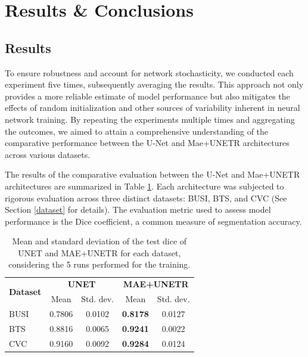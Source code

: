 \newpage

\section{Results \& Conclusions}
\subsection{Results}

To ensure robustness and account for network stochasticity, we conducted each experiment five times, subsequently averaging the results. This approach not only provides a more reliable estimate of model performance but also mitigates the effects of random initialization and other sources of variability inherent in neural network training.
By repeating the experiments multiple times and aggregating the outcomes, we aimed to attain a comprehensive understanding of the comparative performance between the U-Net and Mae+UNETR architectures across various datasets.

The results of the comparative evaluation between the U-Net and Mae+UNETR architectures are summarized in Table \ref{tab:results}. Each architecture was subjected to rigorous evaluation across three distinct datasets: BUSI, BTS, and CVC (See Section \ref{dataset} for details). The evaluation metric used to assess model performance is the Dice coefficient, a common measure of segmentation accuracy.

\begin{table}[H]
\begin{center}
\begin{tabular}{p{2cm}cccc}
     \multirow{2}{4em}{\textbf{Dataset}} & \multicolumn{2}{c}{\textbf{UNET}} & \multicolumn{2}{c}{\textbf{MAE+UNETR}}\\
      & Mean & Std. dev. & Mean & Std. dev. \\
     BUSI & 0.7806 & 0.0102 & \textbf{0.8178} & 0.0127 \\
     BTS & 0.8816 & 0.0065 & \textbf{0.9241} & 0.0022 \\
     CVC & 0.9160 & 0.0092 & \textbf{0.9284} & 0.0124 \\
\end{tabular}
\caption{Mean and standard deviation of the test dice of UNET and MAE+UNETR for each dataset, considering the 5 runs performed for the training.}
\label{tab:results}
\end{center}
\end{table}

